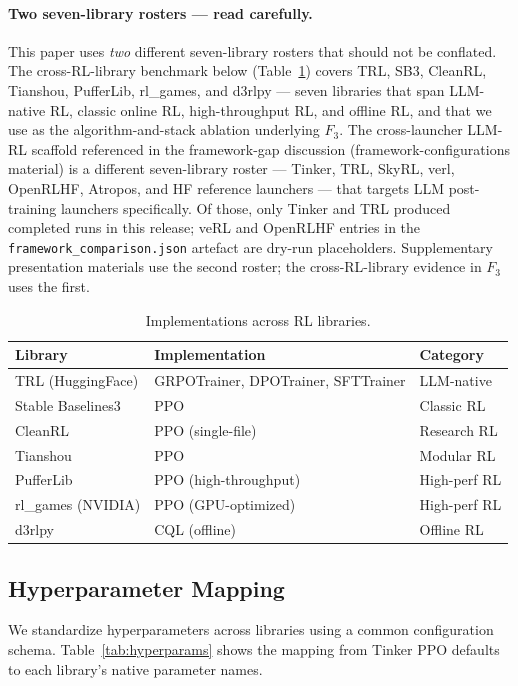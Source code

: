 \documentclass{article}  \usepackage[preprint,nonatbib]{neurips_2026} \usepackage[numbers]{natbib}
\begin{document}
\paragraph{Two seven-library rosters --- read carefully.}
This paper uses \emph{two} different seven-library rosters that
should not be conflated. The cross-RL-library benchmark below
(Table~\ref{tab:implementations}) covers TRL, SB3, CleanRL, Tianshou,
PufferLib, rl\_games, and d3rlpy --- seven libraries that span
LLM-native RL, classic online RL, high-throughput RL, and offline RL,
and that we use as the algorithm-and-stack ablation underlying $F_3$.
The cross-launcher LLM-RL scaffold referenced in the framework-gap
discussion (framework-configurations material) is a different seven-library
roster --- Tinker, TRL, SkyRL, verl, OpenRLHF, Atropos, and HF
reference launchers --- that targets LLM post-training launchers
specifically. Of those, only Tinker and TRL produced completed
runs in this release; veRL and OpenRLHF entries in the
\texttt{framework\_comparison.json} artefact are dry-run
placeholders. Supplementary presentation materials use the second roster; the
cross-RL-library evidence in $F_3$ uses the first.


\begin{table}[htbp]
\centering
\caption{Implementations across RL libraries.}
\label{tab:implementations}
\begin{tabular}{lll}
\toprule
\textbf{Library} & \textbf{Implementation} & \textbf{Category} \\
\midrule
TRL (HuggingFace) & GRPOTrainer, DPOTrainer, SFTTrainer & LLM-native \\
Stable Baselines3 & PPO & Classic RL \\
CleanRL & PPO (single-file) & Research RL \\
Tianshou & PPO & Modular RL \\
PufferLib & PPO (high-throughput) & High-perf RL \\
rl\_games (NVIDIA) & PPO (GPU-optimized) & High-perf RL \\
d3rlpy & CQL (offline) & Offline RL \\
\bottomrule
\end{tabular}
\end{table}

\subsection{Hyperparameter Mapping}

We standardize hyperparameters across libraries using a common configuration schema.
Table~\ref{tab:hyperparams} shows the mapping from Tinker PPO defaults to each library's
native parameter names.
\end{document}
